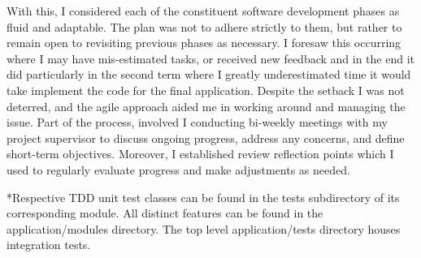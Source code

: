 \documentclass[]{final_report}
\theoremstyle{definition}
\begin{document}
With this, I considered each of the constituent software development phases as fluid and adaptable. The plan was not to adhere strictly to them, but rather to remain open to revisiting previous phases as necessary. I foresaw this occurring where I may have mis-estimated tasks, or received new feedback and in the end it did particularly in the second term where I greatly underestimated time it would take implement the code for the final application. 
Despite the setback I was not deterred, and the agile approach aided me in working around and managing the issue. Part of the process, involved I conducting bi-weekly meetings with my project supervisor to discuss ongoing progress, address any concerns, and define short-term objectives. Moreover, I established review reflection points which I used to regularly evaluate progress and make adjustments as needed.

*Respective TDD unit test classes can be found in the tests subdirectory of its corresponding module. All distinct features can be found in the application/modules directory. The top level application/tests directory houses integration tests.
\end{document}
